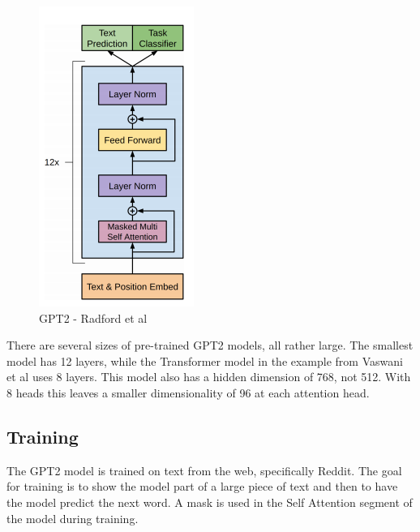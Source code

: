 \begin{figure}[H]
	\begin{center}
		
		
		\includegraphics[scale=3.0]{diagram-mat05}
	\end{center}
	\caption[Generative Pre-Training 2 ]{GPT2 - Radford et al \cite{radford2018improving}}
	

\end{figure}

There are several sizes of pre-trained GPT2 models, all rather large. The smallest model has 12 layers, while the Transformer model in the example from Vaswani et al \cite{Vaswani2017AttentionIA} uses 8 layers. This model also has a hidden dimension of 768, not 512. With 8 heads this leaves a smaller dimensionality of 96 at each attention head. 



\subsection{Training}

The GPT2 model is trained on text from the web, specifically Reddit. The goal for training is to show the model part of a large piece of text and then to have the model predict the next word. A mask is used in the Self Attention segment of the model during training.


